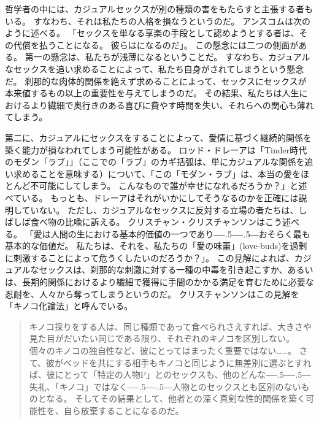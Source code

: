 \documentclass[paper=a4,book,openany]{jlreq}
\def\DDASH{―\kern-.5\zw―\kern-.5\zw―}
\begin{document}
哲学者の中には、カジュアルセックスが別の種類の害をもたらすと主張する者もいる。
すなわち、それは私たちの人格を損なうというのだ。
アンスコムは次のように述べる。
「セックスを単なる享楽の手段として認めようとする者は、その代償を払うことになる。
彼らはになるのだ」\citep{anscombe72contraception}。
この懸念には二つの側面がある。
第一の懸念は、私たちが浅薄になるということだ。
すなわち、カジュアルなセックスを追い求めることによって、私たち自身がされてしまうという懸念だ。
刹那的な肉体的関係を絶えず求めることによって、セックスにセックスが本来値するもの以上の重要性を与えてしまうのだ。
その結果、私たちは人生におけるより繊細で奥行きのある喜びに費やす時間を失い、それらへの関心も薄れてしまう。

第二に、カジュアルにセックスをすることによって、愛情に基づく継続的関係を築く能力が損なわれてしまう可能性がある。
ロッド・ドレーアは「Tinder時代のモダン「ラブ」」（ここでの「ラブ」のカギ括弧は、単にカジュアルな関係を追い求めることを意味する）について、「この「モダン・ラブ」は、本当の愛をほとんど不可能にしてしまう。
こんなもので誰が幸せになれるだろうか？」と述べている\citep{dreher15:_moder_love_age_tind}。
もっとも、ドレーアはそれがいかにしてそうなるのかを正確には説明していない。
ただし、カジュアルなセックスに反対する立場の者たちは、しばしば食べ物の比喩に訴える。
クリスチャン・クリスチャンソンはこう述べる。
「愛は人間の生における基本的価値の一つであり{\DDASH}おそらく最も基本的な価値だ。
私たちは、それを、私たちの「愛の味蕾」(love-buds)を過剰に刺激することによって危うくしたいのだろうか？」\citep[p. 105]{krisjansson98:_casual_sex_revis}。
この見解によれば、カジュアルなセックスは、刹那的な刺激に対する一種の中毒を引き起こすか、あるいは、長期的関係におけるより繊細で獲得に手間のかかる満足を育むために必要な忍耐を、人々から奪ってしまうというのだ。
クリスチャンソンはこの見解を「キノコ化論法」と呼んでいる。

\begin{quote}
  キノコ採りをする人は、同じ種類であって食べられさえすれば、大きさや見た目がだいたい同じである限り、それぞれのキノコを区別しない。
個々のキノコの独自性など、彼にとってはまったく重要ではない……。
さて、彼がベッドを共にする相手もキノコと同じように無差別に選ぶとすれば、彼にとって「特定の人物P」とのセックスも、他のどんな{\DDASH}失礼、「キノコ」ではなく{\DDASH}人物とのセックスとも区別のないものとなる。
そしてその結果として、他者との深く真剣な性的関係を築く可能性を、自ら放棄することになるのだ。
\citep[p. 101]{krisjansson98:_casual_sex_revis}
\end{quote}
\end{document}
